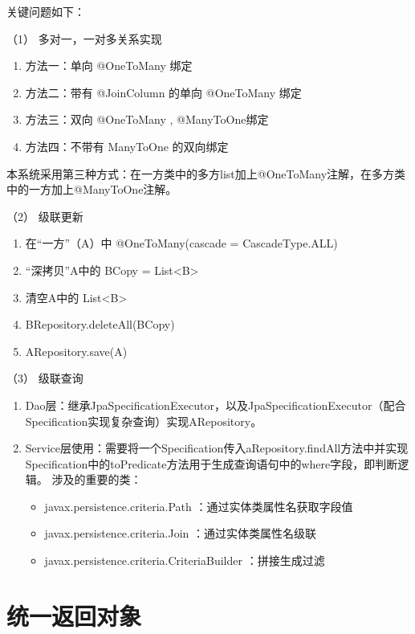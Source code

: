关键问题如下：


（1） 多对一，一对多关系实现

\begin{enumerate}[label=\circled{\arabic*}]
  \item 方法一：单向 @OneToMany 绑定
  \item 方法二：带有 @JoinColumn 的单向 @OneToMany 绑定
  \item 方法三：双向 @OneToMany , @ManyToOne绑定
  \item 方法四：不带有 ManyToOne 的双向绑定
\end{enumerate}

本系统采用第三种方式：在一方类中的多方list加上@OneToMany注解，在多方类中的一方加上@ManyToOne注解。

（2） 级联更新

\begin{enumerate}[label=\circled{\arabic*}]
  \item 在“一方”（A）中  @OneToMany(cascade = CascadeType.ALL)
  \item “深拷贝”A中的  BCopy = List<B>
  \item 清空A中的  List<B>
  \item  BRepository.deleteAll(BCopy)
  \item  ARepository.save(A)
\end{enumerate}

（3） 级联查询

\begin{enumerate}[label=\circled{\arabic*}]
  \item Dao层：继承JpaSpecificationExecutor，以及JpaSpecificationExecutor（配合Specification实现复杂查询）实现ARepository。
  \item Service层使用：需要将一个Specification传入aRepository.findAll方法中并实现Specification中的toPredicate方法用于生成查询语句中的where字段，即判断逻辑。
        涉及的重要的类：
        \begin{itemize}
          \item javax.persistence.criteria.Path ：通过实体类属性名获取字段值
          \item javax.persistence.criteria.Join ：通过实体类属性名级联
          \item javax.persistence.criteria.CriteriaBuilder ：拼接生成过滤
        \end{itemize}
\end{enumerate}

\section{统一返回对象}

